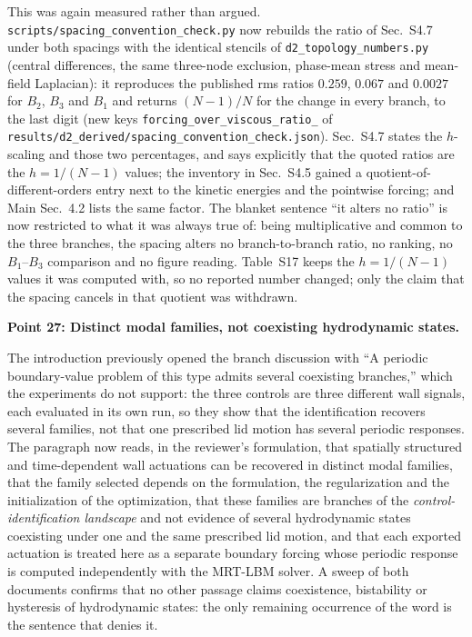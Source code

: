 \documentclass[11pt,a4paper]{article}
\begin{document}
This was again measured rather than argued. \texttt{scripts/spacing\_convention\_check.py}
now rebuilds the ratio of Sec.~S4.7 under both spacings with the identical stencils of
\texttt{d2\_topology\_numbers.py} (central differences, the same three-node exclusion,
phase-mean stress and mean-field Laplacian): it reproduces the published rms ratios
$0.259$, $0.067$ and $0.0027$ for $B_2$, $B_3$ and $B_1$ and returns $(N-1)/N$ for the
change in every branch, to the last digit (new keys
\texttt{forcing\_over\_viscous\_ratio\_} of
\texttt{results/d2\_derived/spacing\_convention\_check.json}). Sec.~S4.7 states the
$h$-scaling and those two percentages, and says explicitly that the quoted ratios are
the $h=1/(N-1)$ values; the inventory in Sec.~S4.5 gained a quotient-of-different-orders
entry next to the kinetic energies and the pointwise forcing; and Main Sec.~4.2 lists
the same factor. The blanket sentence ``it alters no ratio'' is now restricted to what
it was always true of: being multiplicative and common to the three branches, the
spacing alters no branch-to-branch ratio, no ranking, no $B_1$--$B_3$ comparison and no
figure reading. Table~S17 keeps the $h=1/(N-1)$ values it was computed with, so no
reported number changed; only the claim that the spacing cancels in that quotient was
withdrawn.

\vspace{1em}

\noindent\textbf{Point 27: Distinct modal families, not coexisting hydrodynamic
states.}

The introduction previously opened the branch discussion with ``A periodic
boundary-value problem of this type admits several coexisting branches,'' which the
experiments do not support: the three controls are three different wall signals, each
evaluated in its own run, so they show that the identification recovers several
families, not that one prescribed lid motion has several periodic responses. The
paragraph now reads, in the reviewer's formulation, that spatially structured and
time-dependent wall actuations can be recovered in distinct modal families, that the
family selected depends on the formulation, the regularization and the initialization
of the optimization, that these families are branches of the
\emph{control-identification landscape} and not evidence of several hydrodynamic
states coexisting under one and the same prescribed lid motion, and that each exported
actuation is treated here as a separate boundary forcing whose periodic response is
computed independently with the MRT-LBM solver. A sweep of both documents confirms
that no other passage claims coexistence, bistability or hysteresis of hydrodynamic
states: the only remaining occurrence of the word is the sentence that denies it.
\end{document}
